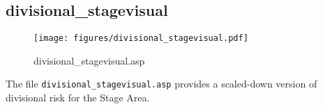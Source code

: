 \subsection{divisional\_stagevisual}
\begin{figure}[htb]
    \begin{center}
        \texttt{[image: figures/divisional\_stagevisual.pdf]}
    \end{center}
    \caption{divisional\_stagevisual.asp}
    \label{fig:divisional_stagevisual}
\end{figure}

The file \verb|divisional_stagevisual.asp| provides a scaled-down version of
divisional risk for the Stage Area.
